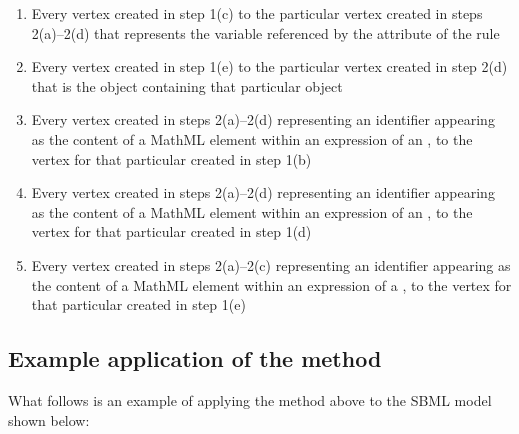 \begin{enumerate}
\begin{enumerate}
  \item Every vertex created in step 1(c) to the particular vertex
    created in steps 2(a)--2(d) that represents the variable
    referenced by the  attribute of the rule
    
  \item Every vertex created in step 1(e) to the particular vertex
    created in step 2(d) that is the \Reaction object containing
    that particular \KineticLaw object
    
  \item Every vertex created in steps 2(a)--2(d) representing an
    identifier appearing as the content of a MathML 
    element within an expression of an \AssignmentRule, to the
    vertex for that particular \AssignmentRule created in step 1(b)
    
  \item Every vertex created in steps 2(a)--2(d) representing an
    identifier appearing as the content of a MathML 
    element within an expression of an \AlgebraicRule, to the
    vertex for that particular \AlgebraicRule created in step 1(d)
    
  \item Every vertex created in steps 2(a)--2(c) representing an
    identifier appearing as the content of a MathML 
    element within an expression of a \KineticLaw, to the vertex
    for that particular \KineticLaw created in step 1(e)

  \end{enumerate}

\end{enumerate}


\subsection*{Example application of the method}

What follows is an example of applying the method above to the
SBML model shown below:


